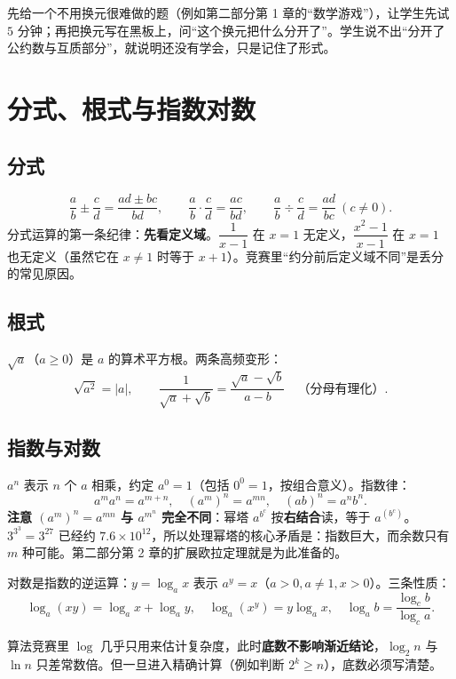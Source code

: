 \begin{teach}[换元的教学顺序]
先给一个不用换元很难做的题（例如第二部分第 1 章的“数学游戏”），让学生先试 $5$ 分钟；再把换元写在黑板上，问“这个换元把什么分开了”。学生说不出“分开了公约数与互质部分”，就说明还没有学会，只是记住了形式。
\end{teach}

\section{分式、根式与指数对数}
\subsection{分式}
\[
\frac ab\pm\frac cd=\frac{ad\pm bc}{bd},\qquad
\frac ab\cdot\frac cd=\frac{ac}{bd},\qquad
\frac ab\div\frac cd=\frac{ad}{bc}\ (c\ne0).
\]
分式运算的第一条纪律：\textbf{先看定义域}。$\dfrac1{x-1}$ 在 $x=1$ 无定义，$\dfrac{x^2-1}{x-1}$ 在 $x=1$ 也无定义（虽然它在 $x\ne1$ 时等于 $x+1$）。竞赛里“约分前后定义域不同”是丢分的常见原因。

\subsection{根式}
$\sqrt{a}$（$a\ge0$）是 $a$ 的算术平方根。两条高频变形：
\[
\sqrt{a^2}=|a|,\qquad
\frac{1}{\sqrt a+\sqrt b}=\frac{\sqrt a-\sqrt b}{a-b}\quad\text{（分母有理化）}.
\]

\subsection{指数与对数}
$a^n$ 表示 $n$ 个 $a$ 相乘，约定 $a^0=1$（包括 $0^0=1$，按组合意义）。指数律：
\[
a^ma^n=a^{m+n},\quad (a^m)^n=a^{mn},\quad (ab)^n=a^nb^n.
\]
\textbf{注意 $(a^m)^n=a^{mn}$ 与 $a^{m^n}$ 完全不同}：幂塔 $a^{b^c}$ 按\textbf{右结合}读，等于 $a^{(b^c)}$。$3^{3^3}=3^{27}$ 已经约 $7.6\times10^{12}$，所以处理幂塔的核心矛盾是：指数巨大，而余数只有 $m$ 种可能。第二部分第 2 章的扩展欧拉定理就是为此准备的。

对数是指数的逆运算：$y=\log_a x$ 表示 $a^y=x$（$a>0,a\ne1,x>0$）。三条性质：
\[
\log_a(xy)=\log_a x+\log_a y,\quad
\log_a(x^y)=y\log_a x,\quad
\log_a b=\frac{\log_c b}{\log_c a}.
\]
\begin{tip}[换底公式的竞赛用法]
算法竞赛里 $\log$ 几乎只用来估计复杂度，此时\textbf{底数不影响渐近结论}，$\log_2 n$ 与 $\ln n$ 只差常数倍。但一旦进入精确计算（例如判断 $2^k\ge n$），底数必须写清楚。
\end{tip}

